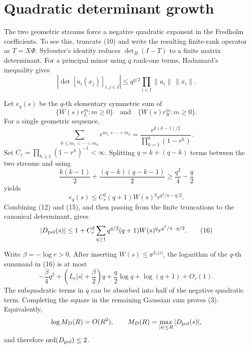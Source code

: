 \section{Quadratic determinant growth}
The two geometric streams force a negative quadratic exponent in the
Fredholm coefficients. To see this, truncate (10) and write the resulting
finite-rank operator as \(T=X\Phi\). Sylvester's identity reduces
\(\det_B(I-T)\) to a finite matrix determinant. For a principal minor using
\(q\) rank-one terms, Hadamard's inequality gives
\[
 \left|\det[u_i(x_j)]_{i,j\in I}\right|
 \le q^{q/2}\prod_{i\in I}\|u_i\|\,\|x_i\|.
 \tag{12}
\]

Let \(e_q(s)\) be the \(q\)-th elementary symmetric sum of
\[
 \{W(s)r_L^m:m\ge0\}
 \quad\text{and}\quad
 \{W(s)r_R^m:m\ge0\}.
\]
For a single geometric sequence,
\[
 \sum_{0\le m_1<\cdots<m_k}r^{m_1+\cdots+m_k}
 =\frac{r^{k(k-1)/2}}{\prod_{h=1}^k(1-r^h)}.
 \tag{13}
\]
Set \(C_r=\prod_{h\ge1}(1-r^h)^{-1}<\infty\). Splitting
\(q=k+(q-k)\) terms between the two streams and using
\[
 \frac{k(k-1)}2+
 \frac{(q-k)(q-k-1)}2
 \ge \frac{q^2}{4}-\frac q2
 \tag{14}
\]
yields
\[
 e_q(s)\le C_r^2(q+1)W(s)^q
 r^{q^2/4-q/2}.
 \tag{15}
\]
Combining (12) and (15), and then passing from the finite truncations to the
canonical determinant, gives
\[
 |D_{\mathrm{pol}}(s)|
 \le 1+C_r^2\sum_{q\ge1}
 q^{q/2}(q+1)W(s)^q r^{q^2/4-q/2}.
 \tag{16}
\]

Write \(\beta=-\log r>0\). After inserting
\(W(s)\le\ee^{L_\ell|s|}\), the logarithm of the \(q\)-th summand in
(16) is at most
\[
 -\frac\beta4q^2
 +\left(L_\ell|s|+\frac\beta2\right)q
 +\frac q2\log q+\log(q+1)+O_r(1).
 \tag{17}
\]
The subquadratic terms in \(q\) can be absorbed into half of the negative
quadratic term. Completing the square in the remaining Gaussian sum proves
(3). Equivalently,
\[
 \log M_D(R)=O(R^2),
 \qquad
 M_D(R)=\max_{|s|\le R}|D_{\mathrm{pol}}(s)|,
\]
and therefore \(\operatorname{ord}(D_{\mathrm{pol}})\le2\).
